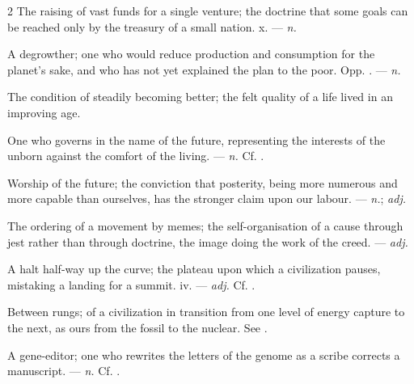 \begin{multicols}{2}
 The raising of vast funds for a single venture; the doctrine that some goals can be reached only by the treasury of a small nation.   x. —  \textit{n.}

 A degrowther; one who would reduce production and consumption for the planet's sake, and who has not yet explained the plan to the poor. Opp. . —  \textit{n.}

 The condition of steadily becoming better; the felt quality of a life lived in an improving age.

 One who governs in the name of the future, representing the interests of the unborn against the comfort of the living. —  \textit{n.} Cf. .

 Worship of the future; the conviction that posterity, being more numerous and more capable than ourselves, has the stronger claim upon our labour. —  \textit{n.};  \textit{adj.}

 The ordering of a movement by memes; the self-organisation of a cause through jest rather than through doctrine, the image doing the work of the creed. —  \textit{adj.}

 A halt half-way up the curve; the plateau upon which a civilization pauses, mistaking a landing for a summit.   iv. —  \textit{adj.} Cf. .

 Between rungs; of a civilization in transition from one level of energy capture to the next, as ours from the fossil to the nuclear. See .

 A gene-editor; one who rewrites the letters of the genome as a scribe corrects a manuscript. —  \textit{n.} Cf. .


\end{multicols}
